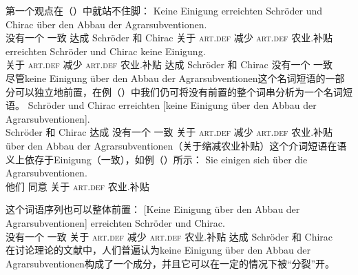 第一个观点在（）中就站不住脚：
\eal
\ex
\gll Keine Einigung erreichten Schröder und Chirac über den          Abbau der          Agrarsubventionen.\footnotemark\\
     没有一个    一致      达成        Schröder 和  Chirac 关于  \textsc{art}.\textsc{def} 减少  \textsc{art}.\textsc{def} 农业.补贴\\
\ex 
{}     erreichten Schröder und Chirac keine Einigung.\\
     \spacebr{}关于 \textsc{art}.\textsc{def} 减少 \textsc{art}.\textsc{def} 农业.补贴 达成 Schröder 和 Chirac 没有一个 一致\\
\zl
尽管keine Einigung über den Abbau der Agrarsubventionen这个名词短语的一部分可以独立地前置，在例（）中我们仍可将没有前置的整个词串分析为一个名词短语。
\ea
\gll Schröder und Chirac erreichten [keine Einigung über den Abbau der Agrarsubventionen].\\
     Schröder 和 Chirac 达成 \spacebr{}没有一个 一致 关于 \textsc{art}.\textsc{def} 减少 \textsc{art}.\textsc{def} 农业.补贴\\
\z
über den Abbau der Agrarsubventionen（关于缩减农业补贴）这个介词短语在语义上依存于Einigung（一致），如例（）所示：
\ea
\gll Sie einigen sich über die Agrarsubventionen.\\
     他们 同意  关于 \textsc{art}.\textsc{def} 农业.补贴\\
\z

这个词语序列也可以整体前置：
\ea
\gll {}[Keine Einigung über den Abbau der Agrarsubventionen] erreichten Schröder und Chirac.\\
     \spacebr{}没有一个 一致 关于 \textsc{art}.\textsc{def} 减少 \textsc{art}.\textsc{def} 农业.补贴  达成 Schröder 和 Chirac\\
\z
在讨论理论的文献中，人们普遍认为keine Einigung über den Abbau der Agrarsubventionen构成了一个成分，并且它可以在一定的情况下被“分裂”开。

